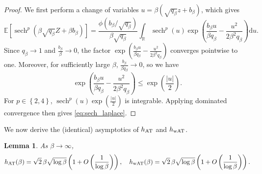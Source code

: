 \documentclass[11pt]{article}
\newtheorem{lemma}{Lemma}
\newcommand{\R}{\mathbb{R}}
\newcommand{\1}{\mathbf{1}}
\newcommand{\0}{\mathbf{0}}
\newcommand{\Par}[1]{\left(#1\right)}
\newcommand{\Brack}[1]{\left[#1\right]}
\newcommand{\Brace}[1]{\left\{#1\right\}}
\newcommand{\Abs}[1]{\left|#1\right|}
\newcommand{\bbE}{{\mathbb{E}}}
\newcommand{\wAT}{_{\rm wAT}}
\newcommand{\AT}{_{\rm AT}}
\begin{document}
\begin{proof}
We first perform a change of variables
$u=\beta(\sqrt{q_\beta}z+b_\beta)$, which gives
\begin{equation}\label{eq:cov_integral}
    \bbE\Brack{
        \operatorname{sech}^p
        \Par{
            \beta\sqrt{q_\beta}Z+\beta b_\beta
        }
    }
    =
    \frac{
        \phi\Par{b_\beta/\sqrt{q_\beta}}
    }{
        \beta\sqrt{q_\beta}
    }
    \int_{\R}
    \operatorname{sech}^p(u)
    \exp\Par{
        \frac{
            b_\beta u
        }{
            \beta q_\beta
        }
        -
        \frac{
            u^2
        }{
            2\beta^2q_\beta
        }
    }
    \mathrm du.
\end{equation}
Since $q_\beta\to1$ and $\frac{b_\beta} \beta\to0$, the factor $\exp(\frac{b_\beta u}{\beta q_\beta} - \frac{u^2}{2\beta^2q_\beta})$
converges pointwise to one. Moreover, for sufficiently large
$\beta$, $\frac{b_\beta}{\beta q_\beta} \to 0$, so we have
\[
    \exp\Par{
        \frac{
            b_\beta u
        }{
            \beta q_\beta
        }
        -
        \frac{
            u^2
        }{
            2\beta^2q_\beta
        }
    }
    \le
    \exp\Par{\frac{\Abs{u}}{2}}.
\]
For $p\in\Brace{2,4}$,
$\operatorname{sech}^p(u)\exp(\frac{|u|}{2})$ is integrable. Applying dominated
convergence then gives \eqref{eq:sech_laplace}.
\end{proof}

We now derive the (identical) asymptotics of $h\AT$ and $h\wAT$.

\begin{lemma}
    \label{lem:at_line}
    As $\beta\to\infty$,
    \[
        h_{\rm AT}(\beta)
        =
        \sqrt{2}\,\beta\sqrt{\log\beta}
        \Par{1+O\Par{\frac{1}{\log\beta}}},
        \quad
        h_{\rm wAT}(\beta)
        =
        \sqrt{2}\,\beta\sqrt{\log\beta}
        \Par{1+O\Par{\frac{1}{\log\beta}}}.
    \]
\end{lemma}
\end{document}
